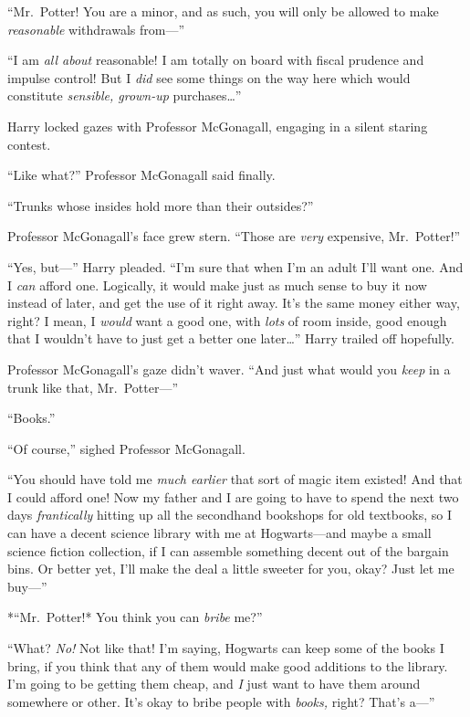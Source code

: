 ``Mr.~Potter! You are a minor, and as such, you will only be allowed to
make \emph{reasonable} withdrawals from---''

``I am \emph{all about} reasonable! I am totally on board with fiscal
prudence and impulse control! But I \emph{did} see some things on the
way here which would constitute \emph{sensible, grown-up}
purchases\ldots{}''

Harry locked gazes with Professor McGonagall, engaging in a silent
staring contest.

``Like what?'' Professor McGonagall said finally.

``Trunks whose insides hold more than their outsides?''

Professor McGonagall's face grew stern. ``Those are \emph{very}
expensive, Mr.~Potter!''

``Yes, but---'' Harry pleaded. ``I'm sure that when I'm an adult I'll
want one. And I \emph{can} afford one. Logically, it would make just as
much sense to buy it now instead of later, and get the use of it right
away. It's the same money either way, right? I mean, I \emph{would} want
a good one, with \emph{lots} of room inside, good enough that I wouldn't
have to just get a better one later\ldots{}'' Harry trailed off
hopefully.

Professor McGonagall's gaze didn't waver. ``And just what would you
\emph{keep} in a trunk like that, Mr.~Potter---''

``Books.''

``Of course,'' sighed Professor McGonagall.

``You should have told me \emph{much earlier} that sort of magic item
existed! And that I could afford one! Now my father and I are going to
have to spend the next two days \emph{frantically} hitting up all the
secondhand bookshops for old textbooks, so I can have a decent science
library with me at Hogwarts---and maybe a small science fiction
collection, if I can assemble something decent out of the bargain bins.
Or better yet, I'll make the deal a little sweeter for you, okay? Just
let me buy---''

*``Mr.~Potter!* You think you can \emph{bribe} me?''

``What? \emph{No!} Not like that! I'm saying, Hogwarts can keep some of
the books I bring, if you think that any of them would make good
additions to the library. I'm going to be getting them cheap, and
\emph{I} just want to have them around somewhere or other. It's okay to
bribe people with \emph{books,} right? That's a---''

